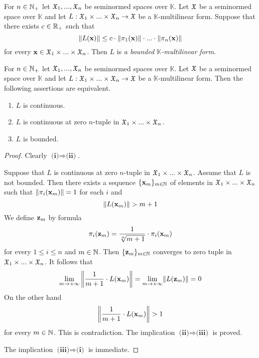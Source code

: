 \begin{definition}
   For $n \in {\mathbb N}_+$ let ${\mathfrak X}_1,...,{\mathfrak X}_n$ be seminormed spaces over $\mathbb{K}$. Let ${\mathfrak X}$ be a seminormed space over $\mathbb{K}$ and let $L:{\mathfrak X}_1\times ... \times {\mathfrak X}_n\rightarrow {\mathfrak X}$ be a $\mathbb{K}$-multilinear form. Suppose that there exists $c \in {\mathbb R}_+$ such that
   $$\lVert L(\mathbf{x})\rVert \leq c\cdot \lVert\pi_1(\mathbf{x})\rVert\cdot ... \cdot \lVert\pi_n(\mathbf{x})\rVert$$
   for every $\mathbf{x} \in {\mathfrak X}_1\times ...\times {\mathfrak X}_n$. Then $L$ is \textit{a bounded $\mathbb{K}$-multilinear form}.
\end{definition}

\begin{theorem}\label{theorem:characterization_of_bounded_multilinear_maps}
   For $n \in {\mathbb N}_+$ let ${\mathfrak X}_1,...,{\mathfrak X}_n$ be seminormed spaces over $\mathbb{K}$. Let ${\mathfrak X}$ be a seminormed space over $\mathbb{K}$ and let $L:{\mathfrak X}_1\times ... \times {\mathfrak X}_n\rightarrow {\mathfrak X}$ be a $\mathbb{K}$-multilinear form. Then the following assertions are equivalent.
   \begin{enumerate}[label=\emph{\textbf{(\roman*)}}, leftmargin=*]
      \item $L$ is continuous.
      \item $L$ is continuous at zero $n$-tuple in ${\mathfrak X}_1\times ... \times {\mathfrak X}_n$.
      \item $L$ is bounded.
   \end{enumerate}
\end{theorem}
\begin{proof}
   Clearly $\textbf{(i)}\Rightarrow \textbf{(ii)}$.

   Suppose that $L$ is continuous at zero $n$-tuple in ${\mathfrak X}_1\times ... \times {\mathfrak X}_n$. Assume that $L$ is not bounded. Then there exists a sequence $\{\mathbf{x}_m\}_{m\in {\mathbb N}}$ of elements in ${\mathfrak X}_1\times ...\times {\mathfrak X}_n$ such that $\lVert \pi_i(\mathbf{x}_m)\rVert = 1$ for each $i$ and
   $$\lVert L(\mathbf{x}_m)\rVert > m + 1$$
   We define $\mathbf{z}_m$ by formula
   $$\pi_i(\mathbf{z}_m) = \frac{1}{\sqrt[n]{m+1}}\cdot \pi_i(\mathbf{x}_m)$$
   for every $1\leq i \leq n$ and $m \in {\mathbb N}$. Then $\{\mathbf{z}_m\}_{m \in {\mathbb N}}$ converges to zero tuple in ${\mathfrak X}_1\times ...\times {\mathfrak X}_n$. It follows that
   $$\lim_{m\rightarrow +\infty}\bigg\lVert \frac{1}{m + 1}\cdot L(\mathbf{x}_m)\bigg\rVert = \lim_{m\rightarrow +\infty}\lVert L(\mathbf{z}_m)\rVert = 0$$
   On the other hand
   $$\bigg\lVert \frac{1}{m + 1}\cdot L(\mathbf{x}_m)\bigg\rVert > 1$$
   for every $m \in {\mathbb N}$. This is contradiction. The implication $\textbf{(ii)} \Rightarrow \textbf{(iii)}$ is proved. 

   The implication $\textbf{(iii)}\Rightarrow \textbf{(i)}$ is immediate.
\end{proof}

